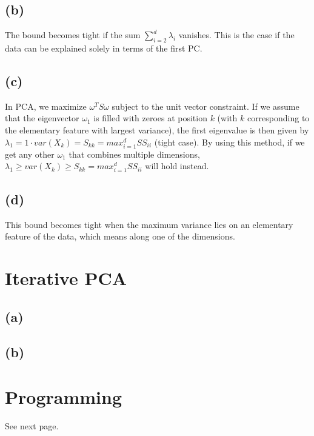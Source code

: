 \documentclass{article}
\begin{document}
\subsection*{(b)}
The bound becomes tight if the sum $\sum_{i=2}^d \lambda_i$ vanishes. This is the case if the data can be explained solely in terms of the first PC.

\subsection*{(c)}
In PCA, we maximize $\omega^T S \omega$ subject to the unit vector constraint. If we assume that the eigenvector $\omega_1$ is filled with zeroes at position $k$ (with $k$ corresponding to the elementary feature with largest variance), the first eigenvalue is then given by $\lambda_1=1\cdot var(X_k) = S_{kk} = max_{i=1}^d SS_{ii}$ (tight case). By using this method, if we get any other $\omega_1$ that combines multiple dimensions, $\lambda_1 \geq var(X_k) \geq S_{kk} = max_{i=1}^d SS_{ii}$ will hold instead.

\subsection*{(d)}
This bound becomes tight when the maximum variance lies on an elementary feature of the data, which means along one of the dimensions.


\section{Iterative PCA}

\subsection*{(a)}


\subsection*{(b)}


\section*{Programming}
See next page.

%

%

\end{document}
